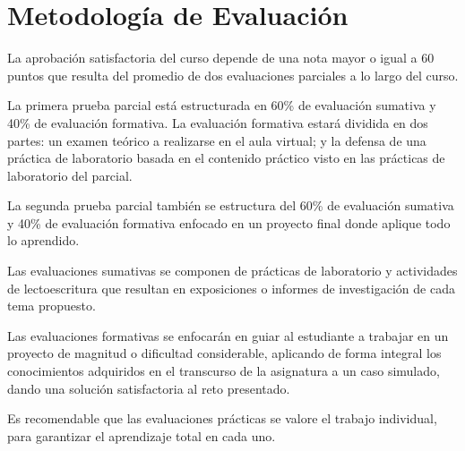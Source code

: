\section{Metodología de Evaluación}

La aprobación satisfactoria del curso depende de una nota mayor o igual a 60 puntos que resulta del promedio de dos evaluaciones parciales a lo largo del curso.

La primera prueba parcial está estructurada en 60\% de evaluación sumativa y 40\% de evaluación formativa. La evaluación formativa estará dividida en dos partes: un examen teórico a realizarse en el aula virtual; y la defensa de una práctica de laboratorio basada en el contenido práctico visto en las prácticas de laboratorio del parcial.

La segunda prueba parcial también se estructura del 60\% de evaluación sumativa y 40\% de evaluación formativa enfocado en un proyecto final donde aplique todo lo aprendido.

Las evaluaciones sumativas se componen de prácticas de laboratorio y actividades de lectoescritura que resultan en exposiciones o informes de investigación de cada tema propuesto.

Las evaluaciones formativas se enfocarán en guiar al estudiante a trabajar en un proyecto de magnitud o dificultad considerable, aplicando de forma integral los conocimientos adquiridos en el transcurso de la asignatura a un caso simulado, dando una solución satisfactoria al reto presentado.

Es recomendable que las evaluaciones prácticas se valore el trabajo individual, para garantizar el aprendizaje total en cada uno.

\pagebreak